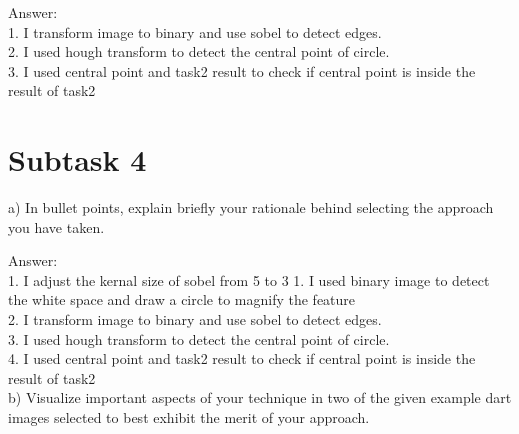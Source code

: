 \documentclass[12pt]{article}
\begin{document}
Answer: \\
1. I transform image to binary and use sobel to detect edges.\\
2. I used hough transform to detect the central point of circle.\\
3. I used central point and task2 result to check if central point is inside the result of task2\\


\section{Subtask 4}

a) In bullet points, explain briefly your rationale behind selecting the approach you have taken.\

Answer: \\
1. I adjust the kernal size of sobel from 5 to 3
1. I used binary image to detect the white space and draw a circle to magnify the feature\\
2. I transform image to binary and use sobel to detect edges.\\
3. I used hough transform to detect the central point of circle.\\
4. I used central point and task2 result to check if central point is inside the result of task2\\

b) Visualize important aspects of your technique in two of the given example dart images selected to best exhibit the merit of your approach.\\
\end{document}
